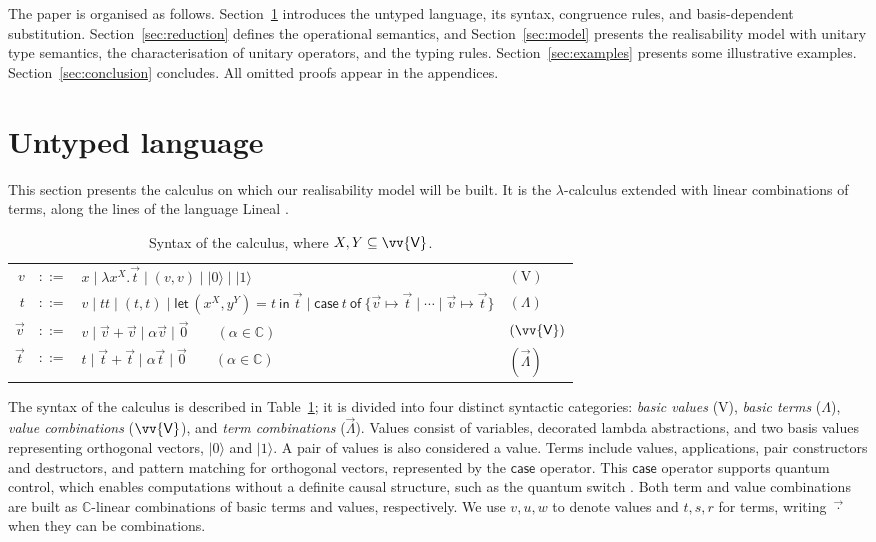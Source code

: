 \documentclass[a4paper,UKenglish,numberwithinsect,pdfa,anonymous]{lipics-v2021}
\theoremstyle{restatestyle}
\newcommand\ket[1]{\ensuremath{|#1\rangle}}
\newcommand\s[1]{\ensuremath{\mathsf{#1}}}
\newcommand\Val{{\s V}}
\DeclareRobustCommand{\ValD}{\ensuremath{\vv{\mathsf{V}}}}
\def\C{\mathbb{C}}            %
\def\Val{\mathrm{V}}          %
\def\Pair#1#2{(#1,#2)} %
\def\Lam#1#2#3{\lambda#1^{#2}{.}#3} %
\def\letkeyword{\mathsf{let}}
\def\inkeyword{\mathsf{in}}
\def\LetP#1#2#3#4#5#6{\letkeyword\,\Pair{#1^{#2}}{#3^{#4}}=#5~\inkeyword~#6}
\def\gencase#1#2#3#4#5{\ensuremath{\mathsf{case}~#1~\mathsf{of}~\{#2\mapsto #4 \mid \dotsb \mid #3\mapsto #5\}}}
\begin{document}
The paper is organised as follows.  
Section~\ref{sec:calculus} introduces the untyped language, its syntax, congruence rules,
and basis-dependent substitution.  
Section~\ref{sec:reduction} defines the operational semantics, and
Section~\ref{sec:model} presents the realisability model with unitary type semantics,
the characterisation of unitary operators, and the typing rules.  
Section~\ref{sec:examples} presents some illustrative examples.
Section~\ref{sec:conclusion} concludes.
All omitted proofs appear in the appendices.

\section{Untyped language}\label{sec:calculus}
This section presents the calculus on which our realisability model will be
built. It is the $\lambda$-calculus extended with linear combinations of terms, 
along the lines of the language Lineal \cite{ArrighiDowekLMCS17}.

\begin{table}[t]
  \centering
  \begin{tabular}{rcll}
    $v$ & $::=$ & $x \mid \Lam{x}{X}{\vec{t}} \mid (v, v) \mid \ket{0} \mid \ket{1}$ & $(\Val)$ \\
    $t$ & $::=$ & $v \mid tt \mid (t,t) \mid \LetP{x}{X}{y}{Y}{t}{\vec{t}} \mid \gencase{t}{\vec{v}}{\vec{v}}{\vec{t}}{\vec{t}}$ & $(\Lambda)$ \\
    $\vec{v}$ & $::=$ & $v \mid \vec{v}+\vec{v} \mid \alpha \vec{v} \mid \vec 0 \qquad (\alpha\in\C)$ & $(\ValD)$ \\
    $\vec{t}$ & $::=$ & $t \mid \vec{t}+\vec{t} \mid \alpha \vec{t} \mid \vec 0 \qquad (\alpha\in\C)$ & $(\vec \Lambda)$
  \end{tabular}
  \caption{Syntax of the calculus, where $X, Y \subseteq \ValD$.}
  \label{tab:Syntax}
\end{table}
The syntax of the calculus is described in
Table~\ref{tab:Syntax}; it is divided into four
distinct syntactic categories: \emph{basic values} ($\Val$), \emph{basic terms}
($\Lambda$), \emph{value combinations} ($\ValD$), and \emph{term
combinations} ($\vec\Lambda$). Values consist of variables, decorated
lambda abstractions, and two basis values representing orthogonal vectors,
$\ket 0$ and $\ket 1$. A pair of values is also considered a value.  Terms
include values, applications, pair constructors and destructors, and pattern
matching for orthogonal vectors, represented by the $\mathsf{case}$ operator.
This $\mathsf{case}$ operator supports quantum control, which enables
computations without a definite causal structure, such as the quantum switch 
\cite{Chiribella_2013}.
Both term and value combinations are built as $\C$-linear combinations of
basic terms and values, respectively. We use $v,u,w$ to denote values and
$t,s,r$ for terms, writing $\vec{\cdot}$ when they can be combinations.
\end{document}
